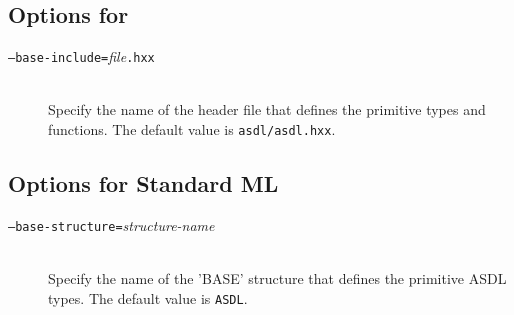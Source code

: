 \subsection*{Options for \Cplusplus}

\begin{description}
  \item[\normalfont\texttt{--base-include=}\textit{file}\texttt{.hxx}] \mbox{}\\
    Specify the name of the \Cplusplus{}header file that defines the primitive \asdl{} types
    and functions.
    The default value is \texttt{asdl/asdl.hxx}.
\end{description}%

\subsection*{Options for Standard ML}
\begin{description}
  \item[\normalfont\texttt{--base-structure=}\textit{structure-name}] \mbox{}\\
    Specify the name of the 'BASE' structure that defines the primitive ASDL types.
    The default value is \lstinline[language=SML]!ASDL!.
\end{description}%

